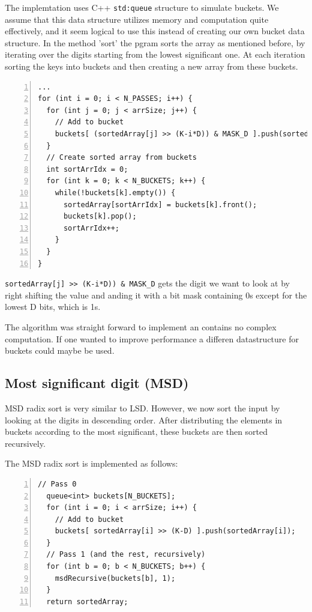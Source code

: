 The implemtation uses C++ \verb!std:queue! structure to simulate buckets. We assume that this data structure utilizes memory and computation quite effectively, and it seem logical to use this instead of creating our own bucket data structure.
In the method 'sort' the pgram sorts the array as mentioned before, by iterating over the digits starting from the lowest significant one. At each iteration sorting the keys into buckets and then creating a new array from these buckets.
\begin{lstlisting}[numbers=left]
...
for (int i = 0; i < N_PASSES; i++) {
  for (int j = 0; j < arrSize; j++) {
    // Add to bucket
    buckets[ (sortedArray[j] >> (K-i*D)) & MASK_D ].push(sortedArray[j]);
  }
  // Create sorted array from buckets
  int sortArrIdx = 0;
  for (int k = 0; k < N_BUCKETS; k++) {
    while(!buckets[k].empty()) {
      sortedArray[sortArrIdx] = buckets[k].front();
      buckets[k].pop();
      sortArrIdx++;
    }
  }
}
\end{lstlisting}
\verb!sortedArray[j] >> (K-i*D)) & MASK_D! gets the digit we want to look at by right shifting the value and anding it with a bit mask containing 0s except for the lowest D bits, which is 1s.

The algorithm was straight forward to implement an contains no complex computation. If one wanted to improve performance a differen datastructure for buckets could maybe be used.



\subsection{Most significant digit (MSD)}
MSD radix sort is very similar to LSD. However, we now sort the input by looking at the digits in descending order.
After distributing the elements in buckets according to the most significant, these buckets are then sorted recursively.

The MSD radix sort is implemented as follows:
\begin{lstlisting}[numbers=left]
  // Pass 0
  queue<int> buckets[N_BUCKETS];
  for (int i = 0; i < arrSize; i++) {
    // Add to bucket
    buckets[ sortedArray[i] >> (K-D) ].push(sortedArray[i]);
  }
  // Pass 1 (and the rest, recursively)
  for (int b = 0; b < N_BUCKETS; b++) {
    msdRecursive(buckets[b], 1);
  }
  return sortedArray;
\end{lstlisting}


